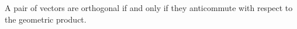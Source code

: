 \begin{corollary}
	A pair of vectors are orthogonal if and only if they anticommute with respect to the geometric product.
\end{corollary}

